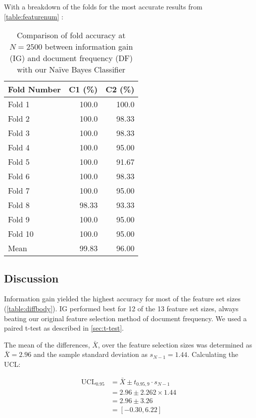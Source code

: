 \documentclass[10pt, a4paper]{article}
\begin{document}
With a breakdown of the folds for the most accurate results from \autoref{table:featurenum} :
\begin{table}[H]
\centering
\caption{Comparison of fold accuracy at $N=2500$ between information gain (IG) and document frequency (DF) with our Na\"ive Bayes Classifier}
\begin{tabular}{@{}lrr@{}}
\toprule
\textbf{Fold Number} & \textbf{C1 (\%)} & \textbf{C2 (\%)} \\
\midrule
Fold 1 & 100.0 & 100.0 \\
Fold 2 & 100.0 & 98.33 \\
Fold 3 & 100.0 & 98.33 \\
Fold 4 & 100.0 & 95.00 \\
Fold 5 & 100.0 & 91.67 \\
Fold 6 & 100.0 & 98.33 \\
Fold 7 & 100.0 & 95.00 \\
Fold 8 & 98.33 & 93.33 \\
Fold 9 & 100.0 & 95.00 \\
Fold 10 & 100.0 & 95.00 \\
\bottomrule
Mean & 99.83 & 96.00 \\
\bottomrule
\end{tabular}
\label{table:foldsn2500}
\end{table} 


\subsection{Discussion}

Information gain yielded the highest accuracy for most of the feature set sizes (\autoref{table:diffbody}). IG performed best for 12 of the 13 feature set sizes, always beating our original feature selection method of document frequency. We used a paired t-test as described in \ref{sec:t-test}.

The mean of the differences, $\bar{X}$, over the feature selection sizes was determined as $\bar{X} = 2.96$ and the sample standard deviation as $s_{N-1} = 1.44$. Calculating the UCL:

\begin{align*}
\text{UCL}_{0.95} &= \bar{X} \pm t_{0.95,9} \cdot s_{N-1} \\
  &= 2.96 \pm 2.262 \times 1.44 \\
  &= 2.96 \pm 3.26 \\
  &= [-0.30, 6.22]
\end{align*}
\end{document}
